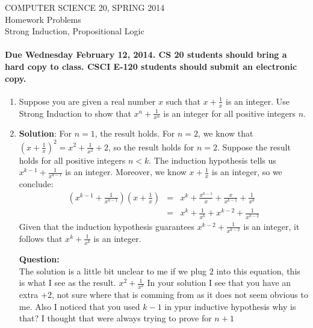 \documentclass[12pt]{article}
\begin{document}
\begin{center}
COMPUTER SCIENCE 20, SPRING 2014 \\
Homework Problems\\
Strong Induction, Propositional Logic
\end{center}

\smallskip


\paragraph*{Due Wednesday February 12, 2014. CS 20 students should bring a hard copy to class. CSCI E-120 students should submit an electronic copy.} 


\begin{enumerate}

\item Suppose you are given a real number $x$ such that $x + \frac{1}{x}$ is an integer.  Use Strong Induction to show that $x^n + \frac{1}{x^n}$ is an integer for all positive integers $n$.

\item[ ] {\bf Solution}: For $n=1$, the result holds. For $n=2$, we know that $(x+\frac{1}{x})^2 =x^2 + \frac{1}{x^2} + 2$, so the result holds for $n=2$. Suppose the result holds for all positive integers $n<k$. The induction hypothesis tells us $x^{k-1}+\frac{1}{x^{k-1}}$ is an integer. Moreover, we know $x+\frac 1 x$ is an integer, so we conclude:
\begin{eqnarray*}
(x^{k-1}+\frac{1}{x^{k-1}})(x+\frac 1 x) &=& x^k + \frac{x^{k-1}}{x}+\frac{x}{x^{k-1}} + \frac{1}{x^k}\\
&=&x^k+\frac{1}{x^k} + x^{k-2} + \frac{1}{x^{k-2}}
\end{eqnarray*}
Given that the induction hypothesis guarantees $x^{k-2} + \frac{1}{x^{k-2}}$ is an integer, it follows that  $x^k + \frac 1 {x^k}$ is an integer.

\textbf{Question: } \\
The solution is a little bit unclear to me if we plug $2$ into this equation, this is what I see as the result. $x^2 + \frac{1}{x^2}$ In your solution I see that
you have an extra $+2$, not sure where that is comming from as it does not seem obvious to me. Also I noticed that you used $k-1$ in ypur inductive hypothesis
why is that? I thought that were always trying to prove for $n+1$



\end{enumerate}

\pagebreak
\end{document}
